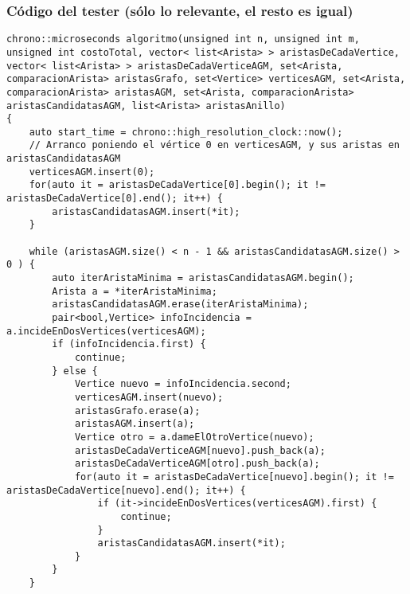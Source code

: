 \subsubsection{Código del tester (sólo lo relevante, el resto es igual)}
\begin{lstlisting}[frame=single]
chrono::microseconds algoritmo(unsigned int n, unsigned int m, unsigned int costoTotal, vector< list<Arista> > aristasDeCadaVertice, vector< list<Arista> > aristasDeCadaVerticeAGM, set<Arista, comparacionArista> aristasGrafo, set<Vertice> verticesAGM, set<Arista, comparacionArista> aristasAGM, set<Arista, comparacionArista> aristasCandidatasAGM, list<Arista> aristasAnillo) 
{
    auto start_time = chrono::high_resolution_clock::now();
    // Arranco poniendo el vértice 0 en verticesAGM, y sus aristas en aristasCandidatasAGM
    verticesAGM.insert(0);
    for(auto it = aristasDeCadaVertice[0].begin(); it != aristasDeCadaVertice[0].end(); it++) {
        aristasCandidatasAGM.insert(*it);
    }
    
    while (aristasAGM.size() < n - 1 && aristasCandidatasAGM.size() > 0 ) {
        auto iterAristaMinima = aristasCandidatasAGM.begin();
        Arista a = *iterAristaMinima;
        aristasCandidatasAGM.erase(iterAristaMinima);           
        pair<bool,Vertice> infoIncidencia = a.incideEnDosVertices(verticesAGM);
        if (infoIncidencia.first) {                             
            continue;
        } else {
            Vertice nuevo = infoIncidencia.second;              
            verticesAGM.insert(nuevo);                          
            aristasGrafo.erase(a);                              
            aristasAGM.insert(a);                               
            Vertice otro = a.dameElOtroVertice(nuevo);
            aristasDeCadaVerticeAGM[nuevo].push_back(a);        
            aristasDeCadaVerticeAGM[otro].push_back(a);
            for(auto it = aristasDeCadaVertice[nuevo].begin(); it != aristasDeCadaVertice[nuevo].end(); it++) {
                if (it->incideEnDosVertices(verticesAGM).first) {
                    continue;                                   
                }
                aristasCandidatasAGM.insert(*it);
            }
        }
    }
    

\end{lstlisting}
